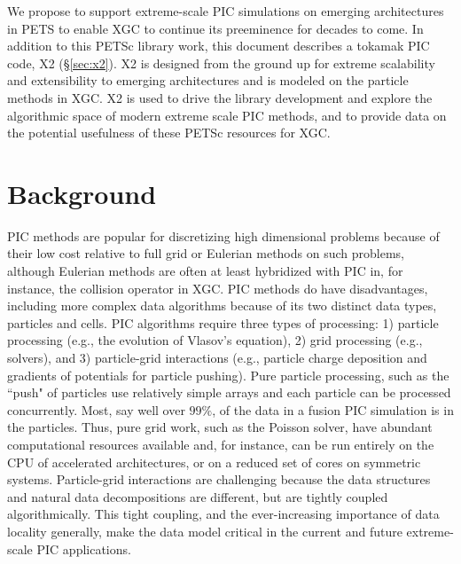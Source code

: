 \documentclass[review]{siamart}
\begin{document}
We propose to support extreme-scale PIC simulations on emerging architectures in PETS to enable XGC to continue its preeminence for decades to come.
In addition to this PETSc library work, this document describes a tokamak PIC code, X2 (\S\ref{sec:x2}).
X2 is designed from the ground up for extreme scalability and extensibility to emerging architectures and is modeled on the particle methods in XGC.
X2 is used to drive the library development and explore the algorithmic space of modern extreme scale PIC methods, and to provide data on the potential usefulness of these PETSc resources for XGC.

\section{Background}

PIC methods are popular for discretizing high dimensional problems because of their low cost relative to full grid or Eulerian methods on such problems, although Eulerian methods are often at least hybridized with PIC in, for instance, the collision operator in XGC.
PIC methods do have disadvantages, including more complex data algorithms because of its two distinct data types, particles and cells.
PIC algorithms require three types of processing: 1) particle processing (e.g., the evolution of Vlasov's equation), 2) grid processing (e.g., solvers), and 3) particle-grid interactions (e.g., particle charge deposition and gradients of potentials for particle pushing).
Pure particle processing, such as the ``push" of particles use relatively simple arrays and each particle can be processed concurrently.
Most, say well over $99\%$, of the data in a fusion PIC simulation is in the particles.
Thus, pure grid work, such as the Poisson solver, have abundant computational resources available and, for instance, can be run entirely on the CPU of accelerated architectures, or on a reduced set of cores on symmetric systems.
Particle-grid interactions are challenging because the data structures and natural data decompositions are different, but are tightly coupled algorithmically.
This tight coupling, and the ever-increasing importance of data locality generally, make the data model critical in the current and future extreme-scale PIC applications.
\end{document}
